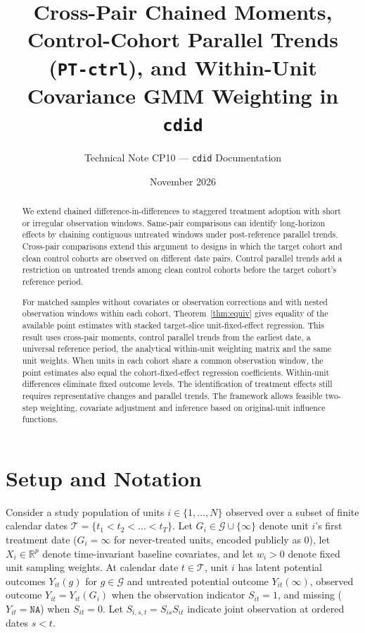 \documentclass[11pt]{article}
\title{Cross-Pair Chained Moments, Control-Cohort Parallel Trends (\texttt{PT-ctrl}), and Within-Unit Covariance GMM Weighting in \texttt{cdid}}
\author{Technical Note CP10 --- \texttt{cdid} Documentation}
\date{November 2026}
\theoremstyle{definition}
\theoremstyle{remark}
\begin{document}
\maketitle

\begin{abstract}
We extend chained difference-in-differences to staggered treatment adoption with short or irregular observation windows. Same-pair comparisons can identify long-horizon effects by chaining contiguous untreated windows under post-reference parallel trends. Cross-pair comparisons extend this argument to designs in which the target cohort and clean control cohorts are observed on different date pairs. Control parallel trends add a restriction on untreated trends among clean control cohorts before the target cohort's reference period.

For matched samples without covariates or observation corrections and with nested observation windows within each cohort, Theorem~\ref{thm:equiv} gives equality of the available point estimates with stacked target-slice unit-fixed-effect regression. This result uses cross-pair moments, control parallel trends from the earliest date, a universal reference period, the analytical within-unit weighting matrix and the same unit weights. When units in each cohort share a common observation window, the point estimates also equal the cohort-fixed-effect regression coefficients. Within-unit differences eliminate fixed outcome levels. The identification of treatment effects still requires representative changes and parallel trends. The framework allows feasible two-step weighting, covariate adjustment and inference based on original-unit influence functions.
\end{abstract}

\section{Setup and Notation}

Consider a study population of units $i \in \{1,\dots,N\}$ observed over a subset of finite calendar dates $\mathcal{T} = \{t_1 < t_2 < \dots < t_T\}$. Let $G_i \in \mathcal{G} \cup \{\infty\}$ denote unit $i$'s first treatment date ($G_i = \infty$ for never-treated units, encoded publicly as $0$), let $X_i \in \mathbb{R}^p$ denote time-invariant baseline covariates, and let $w_i > 0$ denote fixed unit sampling weights. At calendar date $t \in \mathcal{T}$, unit $i$ has latent potential outcomes $Y_{it}(g)$ for $g \in \mathcal{G}$ and untreated potential outcome $Y_{it}(\infty)$, observed outcome $Y_{it} = Y_{it}(G_i)$ when the observation indicator $S_{it} = 1$, and missing ($Y_{it} = \mathtt{NA}$) when $S_{it} = 0$. Let $S_{i,s,t} = S_{is} S_{it}$ indicate joint observation at ordered dates $s < t$.
\end{document}
